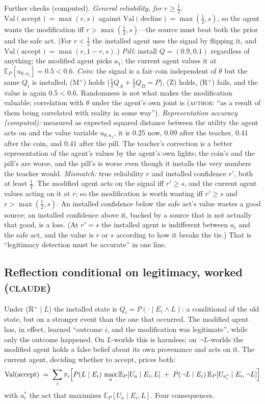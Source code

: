 \documentclass[11pt,a4paper]{article}
\newcommand{\E}{\mathbb{E}}
\newcommand{\Val}{\mathrm{Val}}
\newcommand{\accept}{\text{accept}}
\newcommand{\decline}{\text{decline}}
\newcommand{\AUTHOR}{\textnormal{\scshape author}}
\newcommand{\CLAUDE}{\textnormal{\scshape claude}}
\begin{document}
Further checks (computed). \emph{General reliability, for $r \ge \tfrac12$:} $\Val(\accept) = \max(r, s)$ against $\Val(\decline) = \max(\tfrac12, s)$, so the agent wants the modification iff $r > \max(\tfrac12, s)$---the source must beat both the prior and the safe act. (For $r < \tfrac12$ the installed agent uses the signal by flipping it, and $\Val(\accept) = \max(r, 1 - r, s)$.) \emph{Pill:} install $Q = (0.9, 0.1)$ regardless of anything; the modified agent picks $a_1$; the current agent values it at $\E_P[u_{\theta, a_1}] = 0.5 < 0.6$. \emph{Coin:} the signal is a fair coin independent of $\theta$ but the same $Q_i$ is installed; (M$^+$) holds ($\tfrac12 Q_A + \tfrac12 Q_B = P$), (Z) holds, (R$^+$) fails, and the value is again $0.5 < 0.6$. Randomness is not what makes the modification valuable; correlation with $\theta$ under the agent's own joint is (\AUTHOR: ``as a result of them being correlated with reality in some way''). \emph{Representation accuracy (computed):} measured as expected squared distance between the utility the agent acts on and the value variable $u_{\theta, a_1}$, it is $0.25$ now, $0.09$ after the teacher, $0.41$ after the coin, and $0.41$ after the pill. The teacher's correction is a better representation of the agent's values by the agent's own lights; the coin's and the pill's are worse, and the pill's is worse even though it installs the very numbers the teacher would. \emph{Mismatch:} true reliability $r$ and installed confidence $r'$, both at least $\tfrac12$. The modified agent acts on the signal iff $r' \ge s$, and the current agent values acting on it at $r$; so the modification is worth wanting iff $r' \ge s$ and $r > \max(\tfrac12, s)$. An installed confidence below the safe act's value wastes a good source; an installed confidence above it, backed by a source that is not actually that good, is a loss. (At $r' = s$ the installed agent is indifferent between $a_i$ and the safe act, and the value is $r$ or $s$ according to how it breaks the tie.) That is ``legitimacy detection must be accurate'' in one line.


\subsection{Reflection conditional on legitimacy, worked (\CLAUDE)}
Under (R$^+\mid L$) the installed state is $Q_i = P(\cdot \mid E_i \wedge L)$: a conditional of the old state, but on a stronger event than the one that occurred. The modified agent has, in effect, learned ``outcome $i$, and the modification was legitimate'', while only the outcome happened. On $L$-worlds this is harmless; on $\neg L$-worlds the modified agent holds a false belief about its own provenance and acts on it. The current agent, deciding whether to accept, prices both:
\[
\mathrm{Val}(\text{accept}) \;=\; \sum_i \pi_i \Bigl[ P(L \mid E_i)\, \max_a \mathbb E_P[ U_a \mid E_i, L] \;+\; P(\neg L \mid E_i)\, \mathbb E_P[ U_{a^*_i} \mid E_i, \neg L] \Bigr]
\]
with $a^*_i$ the act that maximizes $\mathbb E_P[ U_a \mid E_i, L]$. Four consequences.
\end{document}

